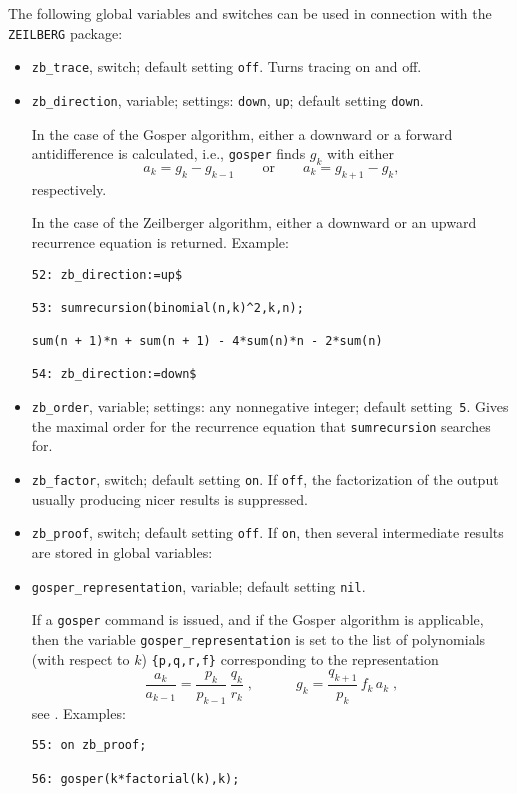 The following global variables and switches can be used in connection with
the {\tt ZEILBERG} package:
\begin{itemize}
\item
{\tt zb\_trace}, switch; default setting {\tt off}.
Turns tracing on and off.
\item
{\tt zb\_direction}, variable; settings: {\tt down}, {\tt up};
default setting {\tt down}.

In the case of the Gosper algorithm, either a downward or a forward
antidifference is calculated, i.e., {\tt gosper} finds $g_k$ with either
\[
a_k=g_k-g_{k-1}
\quad\quad\mbox{or}\quad\quad
a_k=g_{k+1}-g_{k},
\]
respectively.

In the case of the Zeilberger algorithm, either a downward or an upward
recurrence equation is returned. Example:

{\small
\begin{verbatim}
52: zb_direction:=up$

53: sumrecursion(binomial(n,k)^2,k,n);

sum(n + 1)*n + sum(n + 1) - 4*sum(n)*n - 2*sum(n)

54: zb_direction:=down$
\end{verbatim}
}\noindent
\item
{\tt zb\_order}, variable; settings: any nonnegative integer;
default setting~{\tt 5}.
Gives the maximal order for the recurrence
equation that {\tt sumrecursion} searches for.
\item
{\tt zb\_factor}, switch; default setting {\tt on}.
If {\tt off}, the factorization of the output usually producing nicer results
is suppressed.
\item
{\tt zb\_proof}, switch; default setting {\tt off}. If {\tt on},
then several intermediate results are stored in global variables:
\item
{\tt gosper\_representation}, variable; default setting {\tt nil}.

If a {\tt gosper} command is issued, and if the Gosper algorithm is applicable,
then the variable {\tt gosper\_representation} is set to the
list of polynomials (with respect to $k$) {\tt \{p,q,r,f\}}
corresponding to the representation
\[
\frac{a_k}{a_{k-1}}=\frac{p_k}{p_{k-1}}\,\frac{q_k}{r_k}
\;,
\quad\quad\quad
g_k=\frac{q_{k+1}}{p_k}\,f_k\,a_k
\;,
\]
see \cite{Gosper:78}. Examples:

{\small
\begin{verbatim}
55: on zb_proof;

56: gosper(k*factorial(k),k);


\end{verbatim}}
\end{itemize}
